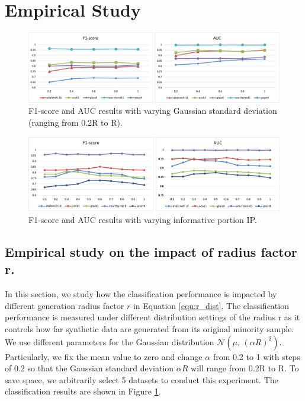  



\section{Empirical Study}

\begin{figure}[ht]
	\centering
	\includegraphics[width=0.98\linewidth, trim=5 10 10 10, clip ]{Figures/r_impact}
	\caption{F1-score and AUC results with varying Gaussian standard deviation (ranging from 0.2R to R).}
	\label{fig:r_result}
\end{figure}

\begin{figure}[h]
	\centering
	\includegraphics[width=0.98\linewidth, trim=5 10 10 10, clip ]{Figures/threshold_impact}
	\caption{F1-score and AUC results with varying informative portion IP.}
	\label{fig:ip_result}
\end{figure}

\subsection{Empirical study on the impact of radius factor r.}
\label{sec:simpor_r_distribution_impact}
In this section, we study how the classification performance is impacted by different generation radius factor $r$ in Equation \ref{equ:r_dist}. The classification performance is measured under different distribution settings of the radius r as it controls how far synthetic data are generated from its original minority sample. We use different parameters for the Gaussian distribution $\mathcal{N}(\mu ,\,{(\alpha R)}^{2})$. Particularly, we fix the mean value to zero and change $\alpha$ from 0.2 to 1 with steps of 0.2 so that the Gaussian standard deviation $\alpha R$ will range from 0.2R to R. To save space, we arbitrarily select 5 datasets to conduct this experiment. The classification results are shown in Figure \ref{fig:r_result}. 


